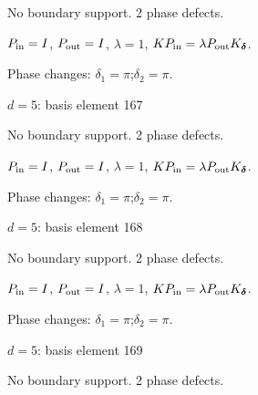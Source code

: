 No boundary support. 2 phase defects.
\begin{center}
\end{center}
\vspace{-1mm}
$P_{\rm in}=I$, \quad $P_{\rm out}=I$, \quad $\lambda=1$, \qquad $K P_{\rm in}=\lambda P_{\rm out}K_{\boldsymbol\delta}$.
\par\smallskip\begin{minipage}{.98\linewidth}\small Phase changes: $\delta_{1}=\pi$;\quad $\delta_{2}=\pi$.\end{minipage}
\vfill
{\footnotesize\texttt{}}
\newpage
{}
{\Large $d=5$: basis element 167}\par
No boundary support. 2 phase defects.
\begin{center}
\end{center}
\vspace{-1mm}
$P_{\rm in}=I$, \quad $P_{\rm out}=I$, \quad $\lambda=1$, \qquad $K P_{\rm in}=\lambda P_{\rm out}K_{\boldsymbol\delta}$.
\par\smallskip\begin{minipage}{.98\linewidth}\small Phase changes: $\delta_{1}=\pi$;\quad $\delta_{2}=\pi$.\end{minipage}
\vfill
{\footnotesize\texttt{}}
\newpage
{}
{\Large $d=5$: basis element 168}\par
No boundary support. 2 phase defects.
\begin{center}
\end{center}
\vspace{-1mm}
$P_{\rm in}=I$, \quad $P_{\rm out}=I$, \quad $\lambda=1$, \qquad $K P_{\rm in}=\lambda P_{\rm out}K_{\boldsymbol\delta}$.
\par\smallskip\begin{minipage}{.98\linewidth}\small Phase changes: $\delta_{1}=\pi$;\quad $\delta_{2}=\pi$.\end{minipage}
\vfill
{\footnotesize\texttt{}}
\newpage
{}
{\Large $d=5$: basis element 169}\par
No boundary support. 2 phase defects.
\begin{center}
\end{center}
